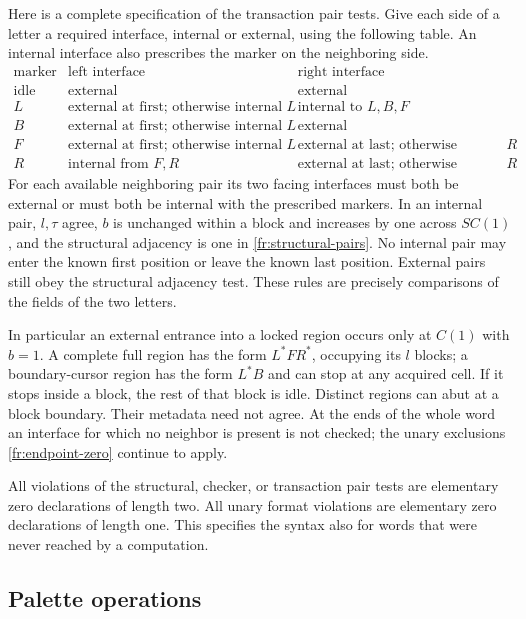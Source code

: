 Here is a complete specification of the transaction pair tests.  Give
each side of a letter a required interface, internal or external,
using the following table.  An internal interface also prescribes the
marker on the neighboring side.
\[
\begin{array}{c|c|c}
 \text{marker}&\text{left interface}&\text{right interface}\\ \hline
 \text{idle}&\text{external}&\text{external}\\
 L&\text{external at first; otherwise internal from }L
   &\text{internal to }L,B,F\\
 B&\text{external at first; otherwise internal from }L
   &\text{external}\\
 F&\text{external at first; otherwise internal from }L
   &\text{external at last; otherwise internal to }R\\
 R&\text{internal from }F,R
   &\text{external at last; otherwise internal to }R
\end{array}
\]
For each available neighboring pair its two facing interfaces must
both be external or must both be internal with the prescribed
markers.  In an internal pair, $l,\tau$ agree, $b$ is unchanged within
a block and increases by one across $SC(1)$, and the structural
adjacency is one in \eqref{fr:structural-pairs}.  No internal pair may
enter the known first position or leave the known last position.
External pairs still obey the structural adjacency test.  These rules
are precisely comparisons of the fields of the two letters.

In particular an external entrance into a locked region occurs only
at $C(1)$ with $b=1$.  A complete full region has the form $L^*FR^*$,
occupying its $l$ blocks; a boundary-cursor region has the form $L^*B$
and can stop at any acquired cell.  If it stops inside a block, the
rest of that block is idle.  Distinct regions can abut at a block
boundary.  Their metadata need not agree.  At the ends of the whole
word an interface for which no neighbor is present is not checked;
the unary exclusions \eqref{fr:endpoint-zero} continue to apply.

All violations of the structural, checker, or transaction pair tests
are elementary zero declarations of length two.  All unary format
violations are elementary zero declarations of length one.  This
specifies the syntax also for words that were never reached by a
computation.

\subsection{Palette operations}\label{fr:palette-operations}

